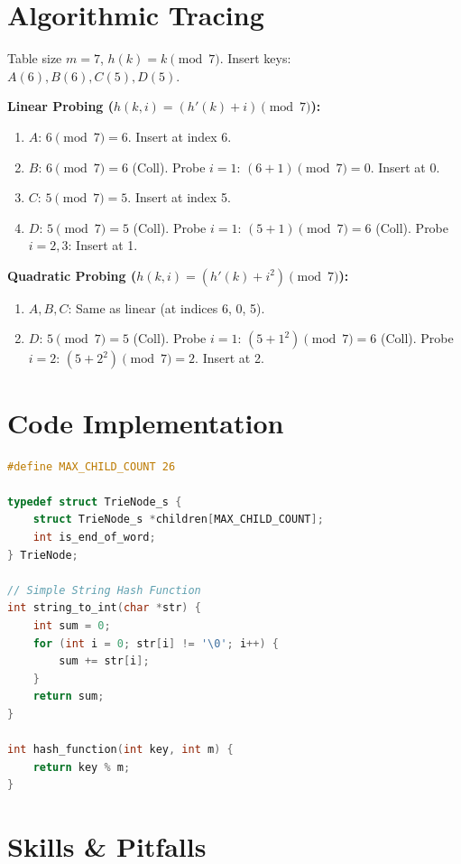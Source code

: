 \section{Algorithmic Tracing}

\begin{example}
Table size $m = 7$, $h(k) = k \pmod 7$. Insert keys: $A(6), B(6), C(5), D(5)$.

\textbf{Linear Probing ($h(k, i) = (h'(k) + i) \pmod 7$):}
\begin{enumerate}
    \item $A$: $6 \pmod 7 = 6$. Insert at index 6.
    \item $B$: $6 \pmod 7 = 6$ (Coll). Probe $i=1$: $(6+1) \pmod 7 = 0$. Insert at 0.
    \item $C$: $5 \pmod 7 = 5$. Insert at index 5.
    \item $D$: $5 \pmod 7 = 5$ (Coll). Probe $i=1$: $(5+1) \pmod 7 = 6$ (Coll). Probe $i=2, 3$: Insert at 1.
\end{enumerate}

\textbf{Quadratic Probing ($h(k, i) = (h'(k) + i^2) \pmod 7$):}
\begin{enumerate}
    \item $A, B, C$: Same as linear (at indices 6, 0, 5).
    \item $D$: $5 \pmod 7 = 5$ (Coll). Probe $i=1$: $(5+1^2) \pmod 7 = 6$ (Coll). Probe $i=2$: $(5+2^2) \pmod 7 = 2$. Insert at 2.
\end{enumerate}
\end{example}

\section{Code Implementation}

\begin{lstlisting}[language=C]
#define MAX_CHILD_COUNT 26

typedef struct TrieNode_s {
    struct TrieNode_s *children[MAX_CHILD_COUNT];
    int is_end_of_word;
} TrieNode;

// Simple String Hash Function
int string_to_int(char *str) {
    int sum = 0;
    for (int i = 0; str[i] != '\0'; i++) {
        sum += str[i];
    }
    return sum;
}

int hash_function(int key, int m) {
    return key % m;
}
\end{lstlisting}

\section{Skills \& Pitfalls}


